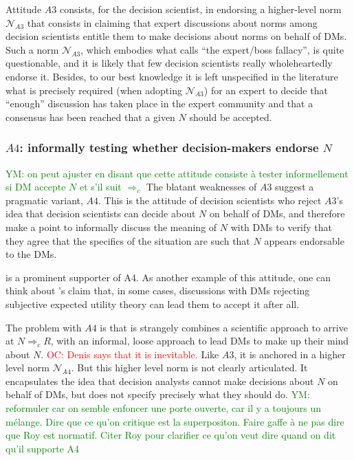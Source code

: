 \documentclass[preprint, french, english, 11pt, authoryear]{elsarticle}%
\newcommand{\protectforpdf}[1]{\texorpdfstring{\ensuremath{#1}}{#1}}
\newcommand{\commentYM}[1]{\textcolor{green}{YM: #1}}
\newcommand{\commentOC}[1]{\textcolor{red}{OC: #1}}
\begin{document}
Attitude $A3$ consists, for the decision scientist, in endorsing a higher-level norm $\mathscr{N}_{A3}$ that consists in claiming that expert discussions about norms among decision scientists entitle them to make decisions about norms on behalf of \acp{DM}. Such a norm $\mathscr{N}_{A3}$, which embodies what \citet{estlund_democratic_2009} calls “the expert/boss fallacy”, is quite questionable, and it is likely that few decision scientists really wholeheartedly endorse it. Besides, to our best knowledge it is left unspecified in the literature what is precisely required (when adopting  $\mathscr{N}_{A3}$) for an expert to decide that “enough” discussion has taken place in the expert community and that a consensus has been reached that a given $N$ should be accepted. 

\subsubsection{\protectforpdf{A4}: informally testing whether decision-makers endorse \protectforpdf{N}}\commentYM{on peut ajuster en disant que cette attitude consiste à tester informellement si DM accepte $N$ et s'il suit $⇒_c$}
The blatant weaknesses of $A3$ suggest a pragmatic variant, $A4$. This is the attitude of decision scientists who reject $A3$'s idea that decision scientists can decide about $N$ on behalf of \acp{DM}, and therefore make a point to informally discuss the meaning of $N$ with \acp{DM} to verify that they agree that the specifics of the situation are such that $N$ appears endorsable to the \acp{DM}.

\citet{roy_multicriteria_1996} is a prominent supporter of A4. As another example of this attitude, one can think about \citet{raiffa_back_1985}’s claim that, in some cases, discussions with \acp{DM} rejecting subjective expected utility theory can lead them to accept it after all.

The problem with $A4$ is that is strangely combines a scientific approach to arrive at $N ⇒_c R$, with an informal, loose approach to lead \acp{DM} to make up their mind about $N$. \commentOC{Denis says that it is inevitable.}
Like $A3$, it is anchored in a higher level norm $\mathscr{N}_{A4}$. But this higher level norm is not clearly articulated. It encapsulates the idea that decision analysts cannot make decisions about $N$ on behalf of \acp{DM}, but does not specify precisely what they should do.
\commentYM{reformuler car on semble enfoncer une porte ouverte, car il y a toujours un mélange. Dire que ce qu'on critique est la superpositon. Faire gaffe à ne pas dire que Roy est normatif. Citer Roy pour clarifier ce qu'on veut dire quand on dit qu'il supporte A4}
\end{document}
